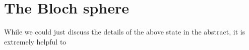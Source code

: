 \section{The Bloch sphere}

While we could just discuss the details of the above state in the abstract, it is extremely helpful to 